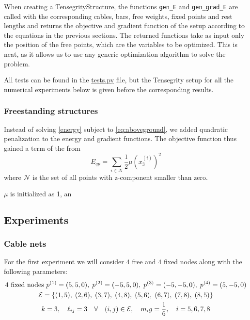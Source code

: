 When creating a TensegrityStructure, the functions \lstinline{gen_E}  and \lstinline{gen_grad_E} are called with the corresponding cables, bars, free weights, fixed points and rest lengths and returns the objective and gradient function of the setup according to the equations in the previous sections. The returned functions take as input only the position of the free points, which are the variables to be optimized. This is neat, as it allows us to use any generic optimization algorithm to solve the problem.

All tests can be found in the \href{https://github.com/otkulseng/Opt1_Project/blob/main/Kode/tests.py}{tests.py} file, but the Tensegrity setup for all the numerical experiments below is given before the corresponding results.

\subsubsection{Freestanding structures}
Instead of solving \eqref{energy} subject to \eqref{eq:aboveground}, we added quadratic penalization to the energy and gradient functions. The objective function thus gained a term of the from 
\begin{equation}
    E_{qp} = \sum_{i \in \mathcal{N}} \frac{1}{2} \mu (x_3^{(i)})^2
\end{equation}
where $\mathcal{N}$ is the set of all points with z-component smaller than zero. 

$\mu$ is initialized as 1, an

\subsection{Experiments}
\subsubsection{Cable nets}
For the first experiment we will consider $4$ free and $4$ fixed nodes along with the following parameters:
\begin{equation*}
\begin{gathered}
    4 \text{ fixed nodes } p^{(1)} = (5,5,0),\; p^{(2)} = (-5,5,0),\; p^{(3)} = (-5,-5,0),\; p^{(4)} = (5,-5,0) \\
    \mathcal{E} = \{(1,5),\;(2,6),\;(3,7),\;(4,8),\; (5,6),\; (6,7),\; (7,8),\; (8,5) \}\\
    k=3,\quad \ell_{ij} = 3 \quad \forall \quad (i,j) \in \mathcal{E}, \quad m_i g = \frac{1}{6}, \quad i= 5,6,7,8 
\end{gathered}
\end{equation*}

